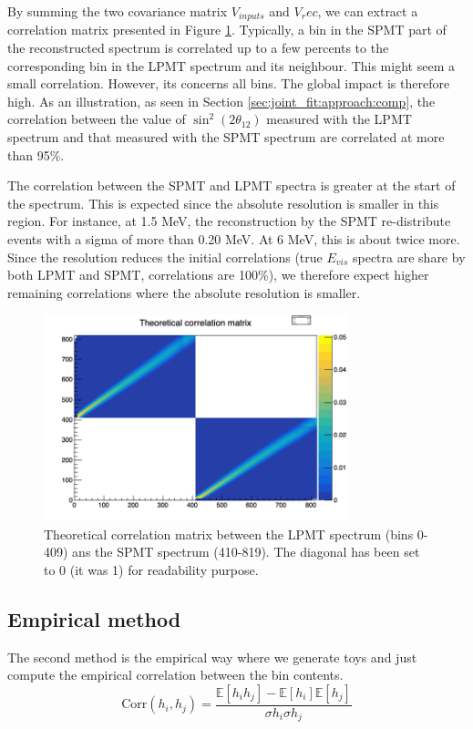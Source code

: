\documentclass[../main.tex]{subfiles}
\begin{document}
By summing the two covariance matrix $V_{inputs}$ and $V_rec$, we can extract a correlation matrix presented in Figure \ref{fig:joint_fit:th_cor_mat}.
Typically, a bin in the SPMT part of the reconstructed spectrum is correlated up to a few percents to the corresponding bin in the LPMT spectrum and its neighbour. This might seem a small correlation. However, its concerns all bins. The global impact is therefore high. As an illustration, as seen in Section \ref{sec:joint_fit:approach:comp}, the correlation between the value of $\sin^2(2 \theta_{12})$ measured with the LPMT spectrum and that measured with the SPMT spectrum are correlated at more than 95\%.

The correlation between the SPMT and LPMT spectra is greater at the start of the spectrum. This is expected since the absolute resolution is smaller in this region. For instance, at 1.5 MeV,  the reconstruction by the SPMT re-distribute events with a sigma of more than 0.20 MeV. At 6 MeV, this is about twice more. Since the resolution reduces the initial correlations (true $E_{vis}$ spectra are share by both LPMT and SPMT, correlations are 100\%), we therefore expect higher remaining correlations where the absolute resolution is smaller.

\begin{figure}[ht]
  \centering
  \includegraphics[height=6cm]{images/joint_fit/theoretical_corr.png}
  \caption{Theoretical correlation matrix between the LPMT spectrum (bins 0-409) ans the SPMT spectrum (410-819). The diagonal has been set to 0 (it was 1) for readability purpose.}
  \label{fig:joint_fit:th_cor_mat}
\end{figure}

\subsection{Empirical method}
\label{sec:joint_fit:cov_mat:emp}

The second method is the empirical way where we generate toys and just compute the empirical correlation between the bin contents.
\begin{equation}
  \mathrm{Corr}(h_i, h_j) = \frac{\mathbb{E}[h_i h_j] - \mathbb{E}[h_i] \mathbb{E}[h_j]}{\sigma h_i \sigma h_j}
\end{equation}
\end{document}
